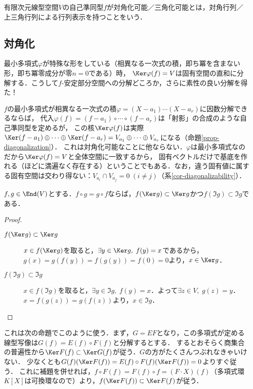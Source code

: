 \documentclass[uplatex, dvipdfmx]{jsreport}
\begin{document}
\begin{definition}
    有限次元線型空間$V$の自己準同型$f$が対角化可能／三角化可能とは，対角行列／上三角行列による行列表示を持つことをいう．
\end{definition}

\subsection{対角化}

\begin{tcolorbox}[colframe=ForestGreen, colback=ForestGreen!10!white, breakable]
    最小多項式$\varphi$が特殊な形をしている（相異なる一次式の積，即ち冪を含まない形，即ち冪零成分が零$n=0$である）時，
    $\Ker\varphi(f)=V$は固有空間の直和に分解する．こうして$f$-安定部分空間への分解どころか，さらに素性の良い分解を得た！

    $f$の最小多項式が相異なる一次式の積$\varphi=(X-a_1)\cdots(X-a_r)$に因数分解できるならば，
    代入$\varphi(f)=(f-a_1)\circ\cdots\circ(f-a_r)$は「射影」の合成のような自己準同型を定めるが，
    この核$\Ker \varphi(f)$は実際$\Ker(f-a_1)\oplus\cdots\oplus\Ker(f-a_r)=V_{a_1}\oplus\cdots\oplus V_{a_r}$になる（命題\ref{prop-diagonalization}）．
    これは対角化可能なことに他ならない．$\varphi$は最小多項式なのだから$\Ker\varphi(f)=V$と全体空間に一致するから，
    固有ベクトルだけで基底を作れる（ほどに満遍なく存在する）ということでもある．なお，違う固有値に属する固有空間は交わり得ない：$V_{a_i}\cap V_{a_j}=0\;(i\ne j)$（系\ref{cor-diagonalizability}）．
\end{tcolorbox}

\begin{lemma}\label{lemma-commutative}
    $f,g\in\End(V)$とする．$f\circ g=g\circ f$ならば，$f(\Ker g)\subset\Ker g$かつ$f(\Im g)\subset\Im g$である．
\end{lemma}
\begin{proof}
    \begin{description}
        \item[$f(\Ker g)\subset\Ker g$] $x\in f(\Ker g)$を取ると，$\exists y\in\Ker g,\;f(y)=x$であるから，$g(x)=g(f(y))=f(g(y))=f(0)=0$より，$x\in\Ker g$．
        \item[$f(\Im g)\subset\Im g$] $x\in f(\Im g)$を取ると，$\exists y\in\Im g,\;f(y)=x$．よって$\exists z\in V,\;g(z)=y$．$x=f(g(z))=g(f(z))$より，$x\in\Im g$．
    \end{description}
\end{proof}
\begin{remark}\label{remark-1}
    これは次の命題でこのように使う．まず，$G=EF$となり，この多項式が定める線型写像は$G(f)=E(f)\circ F(f)$と分解するとする．
    するとおそらく商集合の普遍性から$\Ker F(f)\subset\Ker G(f)$が従う．$G$の方がたくさんつぶれなきゃいけない．
    少なくとも$G(f)(\Ker F(f))=E(f)\circ F(f)(\Ker F(f))=0$よりすぐ従う．
    これに補題を併せれば，$f\circ F(f)=F(f)\circ f=(F\cdot X)(f)$（多項式環$K[X]$は可換環なので）より，$f(\Ker F(f))\subset\Ker F(f)$が従う．
\end{remark}
\end{document}
